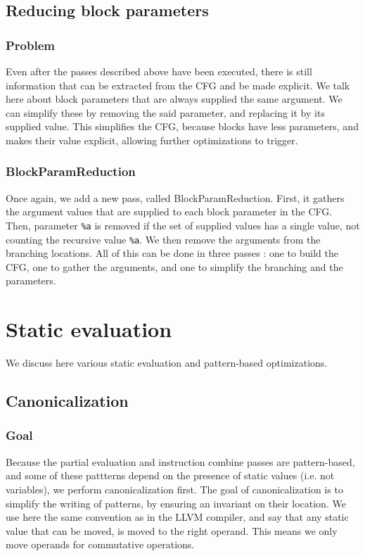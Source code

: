 \documentclass[11pt,a4paper]{article}
\newcommand{\scala}[1]{\textsf{#1}}
\newcommand{\nir}[1]{\texttt{#1}}
\begin{document}
\subsection{Reducing block parameters}

\subsubsection*{Problem}

Even after the passes described above have been executed, there is still information that can be extracted from the CFG and be made explicit. We talk here about block parameters that are always supplied the same argument. We can simplify these by removing the said parameter, and replacing it by its supplied value. This simplifies the CFG, because blocks have less parameters, and makes their value explicit, allowing further optimizations to trigger.

\subsubsection*{BlockParamReduction}

Once again, we add a new pass, called \scala{BlockParamReduction}. First, it gathers the argument values that are supplied to each block parameter in the CFG. Then, parameter \nir{\%a} is removed if the set of supplied values has a single value, not counting the recursive value \nir{\%a}. We then remove the arguments from the branching locations. All of this can be done in three passes : one to build the CFG, one to gather the arguments, and one to simplify the branching and the parameters.

\section{Static evaluation}

We discuss here various static evaluation and pattern-based optimizations.

\subsection{Canonicalization}


\subsubsection*{Goal}

Because the partial evaluation and instruction combine passes are pattern-based, and some of these pattterns depend on the presence of static values (i.e. not variables), we perform canonicalization first. The goal of canonicalization is to simplify the writing of patterns, by ensuring an invariant on their location. We use here the same convention as in the LLVM compiler, and say that any static value that can be moved, is moved to the right operand. This means we only move operands for commutative operations.
\end{document}
